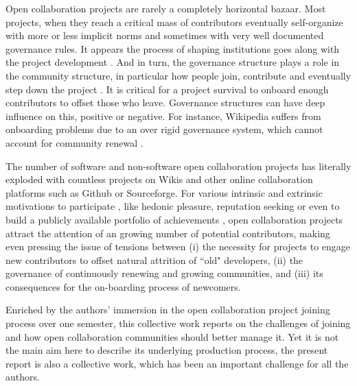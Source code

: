 Open collaboration projects are rarely a completely horizontal bazaar. Most projects, when they reach a critical mass of contributors eventually self-organize with more or less implicit norms and sometimes with very well documented governance rules. It appears the process of shaping institutions goes along with the project development \cite{O'Mahony2007}. And in turn, the governance structure plays a role in the community structure, in particular how people join, contribute and eventually step down the project \cite{}. It is critical for a project survival to onboard enough contributors to offset those who leave. Governance structures can have deep influence on this, positive or negative. For instance, Wikipedia suffers from onboarding problems due to an over rigid governance system, which cannot account for community renewal \cite{halfacker2013}.

The number of software and non-software open collaboration projects has literally exploded with countless projects on Wikis and other online collaboration platforms such as Github or Sourceforge. For various intrinsic and extrinsic motivations to participate , like hedonic pleasure, reputation seeking or even to build a publicly available portfolio of achievements \cite{hars2001} , open collaboration projects attract the attention of an growing number of potential contributors, making even pressing the issue of tensions between (i) the necessity for projects to engage new contributors to offset natural attrition of ``old" developers, (ii)  the governance of continuously  renewing and growing communities, and (iii) its consequences for the on-boarding process of newcomers.

Enriched by the authors' immersion in the open collaboration project joining process over one semester, this collective work reports on the challenges of joining and how open collaboration communities should better manage it. Yet it is not the main aim here to describe its underlying production process,  the present report is also a collective work, which has been an important challenge for all the authors.  

